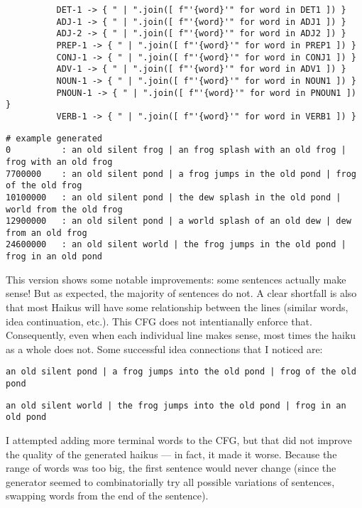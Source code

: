 \begin{enumarabic}
\begin{center}
\begin{small}
\begin{verbatim}
          DET-1 -> { " | ".join([ f"'{word}'" for word in DET1 ]) }
          ADJ-1 -> { " | ".join([ f"'{word}'" for word in ADJ1 ]) }
          ADJ-2 -> { " | ".join([ f"'{word}'" for word in ADJ2 ]) }
          PREP-1 -> { " | ".join([ f"'{word}'" for word in PREP1 ]) }
          CONJ-1 -> { " | ".join([ f"'{word}'" for word in CONJ1 ]) }
          ADV-1 -> { " | ".join([ f"'{word}'" for word in ADV1 ]) }
          NOUN-1 -> { " | ".join([ f"'{word}'" for word in NOUN1 ]) }
          PNOUN-1 -> { " | ".join([ f"'{word}'" for word in PNOUN1 ]) }
          VERB-1 -> { " | ".join([ f"'{word}'" for word in VERB1 ]) }  
        \end{verbatim}
      \end{small}
    \end{center}

    \begin{center}
      \begin{small}
        \begin{verbatim}
# example generated
0          : an old silent frog | an frog splash with an old frog | frog with an old frog
7700000    : an old silent pond | a frog jumps in the old pond | frog of the old frog
10100000   : an old silent pond | the dew splash in the old pond | world from the old frog
12900000   : an old silent pond | a world splash of an old dew | dew from an old frog
24600000   : an old silent world | the frog jumps in the old pond | frog in an old pond
        \end{verbatim} 
      \end{small}
    \end{center}
    This version shows some notable improvements: some sentences
    actually make sense! But as expected, the majority of sentences do not.
    A clear shortfall is also that most Haikus will have some relationship
    between the lines (similar words, idea continuation, etc.).
    This CFG does not intentianally enforce that.
    Consequently, even when each individual line makes sense,
    most times the haiku as a whole does not.
    Some successful idea connections that I noticed are:
    \begin{enumarabic}
      \item \verb#an old silent pond | a frog jumps into the old pond | frog of the old pond#
      \item \verb#an old silent world | the frog jumps into the old pond | frog in an old pond#
    \end{enumarabic}

    I attempted adding more terminal words to the CFG, but that did not improve the quality of the generated haikus
    --- in fact, it made it worse. Because the range of words was too big, the first sentence
    would never change (since the generator seemed to combinatorially try all possible variations of sentences,
    swapping words from the end of the sentence).


\end{enumarabic}
